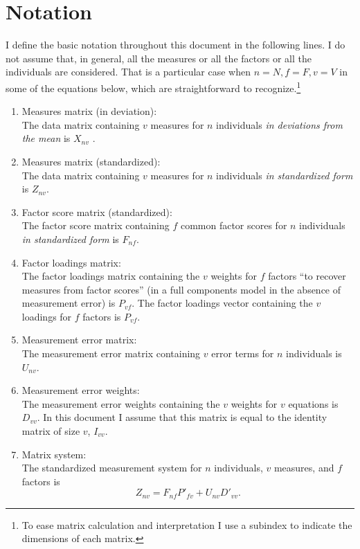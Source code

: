 \section{Notation}
I define the basic notation throughout this document in the following lines. I do not assume that, in general, all the measures or all the factors or all the individuals are considered. That is a particular case when $n= N, f=F, v=V$ in some of the equations below, which are straightforward to recognize.\footnote{To ease matrix calculation and interpretation I use a subindex to indicate the dimensions of each matrix.}
\begin{enumerate}
\item Measures matrix (in deviation): \\
\noindent The data matrix containing $v$ measures for $n$ individuals \textit{in deviations from the mean} is $X_{nv}$ .
\item Measures matrix (standardized): \\
\noindent The data matrix containing $v$ measures for $n$ individuals \textit{in standardized form} is $Z_{nv}$.
\item Factor score matrix (standardized): \\
\noindent The factor score matrix containing $f$ common factor scores for $n$ individuals \textit{in standardized form} is $F_{nf}$.
\item Factor loadings matrix:\\
\noindent The factor loadings matrix containing the $v$ weights for $f$ factors ``to recover measures from factor scores'' (in a full components model in the absence of measurement error) is $P_{vf}$.
\noindent The factor loadings vector containing the $v$ loadings for $f$ factors is $P_{vf}$.  
\item Measurement error matrix:\\
\noindent The measurement error matrix containing $v$ error terms for $n$ individuals is $U_{nv}$.
\item Measurement error weights:\\
\noindent The measurement error weights containing the $v$ weights for $v$ equations is $D_{vv}$. In this document I assume that this matrix is equal to the identity matrix of size $v$, $I_{vv}$.
\item Matrix system:\\
\noindent The standardized measurement system for $n$ individuals, $v$ measures, and $f$ factors is
\begin{equation}
Z_{nv} = F_{nf} P'_{fv} + U_{nv} D'_{vv}.

\end{equation}
\end{enumerate}
